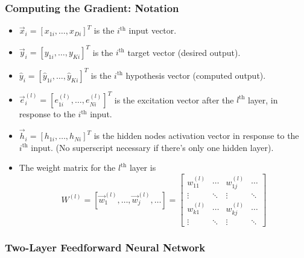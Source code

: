 \documentclass{beamer}
\begin{document}
\begin{frame}
  \frametitle{Computing the Gradient: Notation}
  \begin{itemize}
  \item $\vec{x}_i=[x_{1i},\ldots,x_{Di}]^T$ is the $i^{\textrm{th}}$ input vector.
  \item $\vec{y}_i=[y_{1i},\ldots,y_{Ki}]^T$ is the $i^{\textrm{th}}$ target vector (desired output).
  \item $\hat{y}_i=[\hat{y}_{1i},\ldots,\hat{y}_{Ki}]^T$ is the
    $i^{\textrm{th}}$ hypothesis vector (computed output).
  \item $\vec{e}_i^{(l)}=[e_{1i}^{(l)},\ldots,e_{Ni}^{(l)}]^T$ is the
    excitation vector after the $l^{\textrm{th}}$ layer, in response
    to the $i^{\textrm{th}}$ input.
  \item $\vec{h}_i=[h_{1i},\ldots,h_{Ni}]^T$ is the hidden nodes
    activation vector in response to the $i^{\textrm{th}}$ input. (No
     superscript necessary if there's only one hidden layer).
  \item The weight matrix for the $l^{\textrm{th}}$ layer is
    \[
    W^{(l)}=\left[\vec{w}_1^{(l)},\ldots,\vec{w}_j^{(l)},\ldots\right]=
    \left[\begin{array}{cccc}
        w_{11}^{(l)}&\cdots&w_{1j}^{(l)}&\cdots\\
        \vdots &\ddots&\vdots&\ddots\\
        w_{k1}^{(l)}&\cdots&w_{kj}^{(l)}&\cdots\\
        \vdots &\ddots&\vdots&\ddots
      \end{array}\right]
    \]
  \end{itemize}
\end{frame}
      
\begin{frame}
  \frametitle{Two-Layer Feedforward Neural Network}
  \begin{small}\end{small}
\end{frame}
\end{document}
